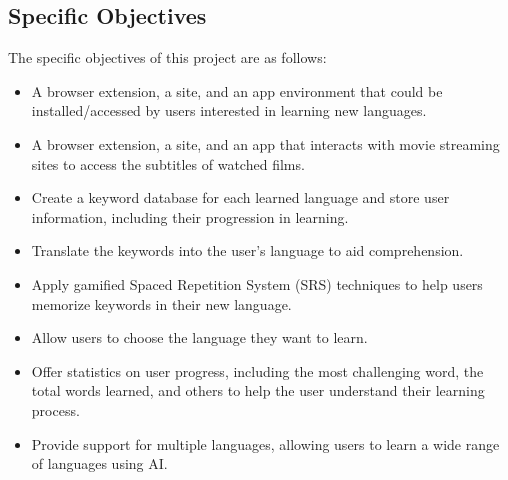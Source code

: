 \documentclass[12pt]{article}
\begin{document}
\subsection{Specific Objectives}

The specific objectives of this project are as follows:
\begin{itemize}
\item A browser extension, a site, and an app environment that could be installed/accessed by users interested in learning new languages.
\item A browser extension, a site, and an app that interacts with movie streaming sites to access the subtitles of watched films.
\item Create a keyword database for each learned language and store user information, including their progression in learning.
\item Translate the keywords into the user's language to aid comprehension.
\item Apply gamified Spaced Repetition System (SRS) techniques to help users memorize keywords in their new language.
\item Allow users to choose the language they want to learn.
\item Offer statistics on user progress, including the most challenging word, the total words learned, and others to help the user understand their learning process.
\item Provide support for multiple languages, allowing users to learn a wide range of languages using AI.
\end{itemize}
\end{document}
